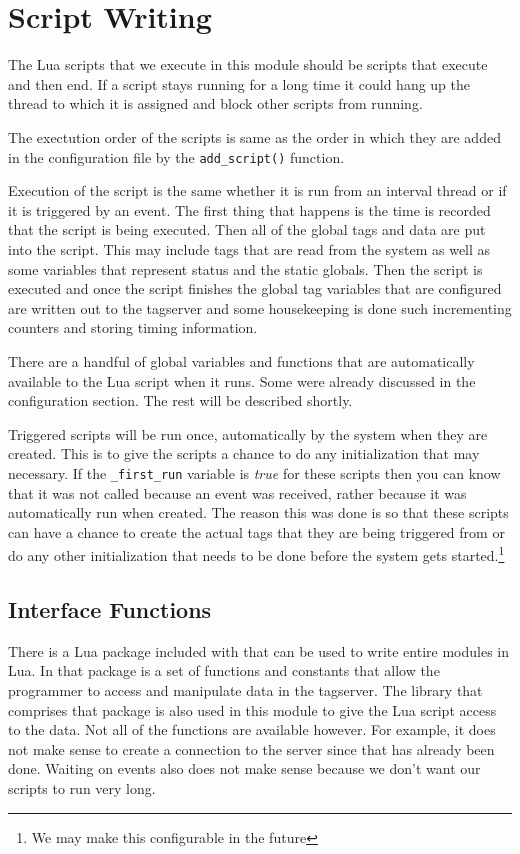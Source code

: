 \section{Script Writing}

The Lua scripts that we execute in this module should be scripts that execute and then
end.  If a script stays running for a long time it could hang up the thread to which it
is assigned and block other scripts from running.

The exectution order of the scripts is same as the order in which they are added in the
configuration file by the \texttt{add\_script()} function.

Execution of the script is the same whether it is run from an interval thread or if
it is triggered by an event.  The first thing that happens is the time is
recorded
that the script is being executed.  Then all of the global
tags and data are put into the script.  This may include tags that are read from the
system as well as some variables that represent status and the static globals.
Then the script is executed and once the script finishes the global tag variables
that are configured are written out to the tagserver and some housekeeping is done such
incrementing counters and storing timing information.

There are a handful of global variables and functions that are automatically available
to the Lua script when it runs.  Some were already discussed in the configuration
section.  The rest will be described shortly.

Triggered scripts will be run once, automatically by the system when they
are created.  This is to give the scripts a chance to do any initialization
that may necessary.  If the \texttt{\_first\_run} variable is \textit{true} for
these scripts then you can know that it was not called because an event
was received, rather because it was automatically run when created.  The
reason this was done is so that these scripts can have a chance to create
the actual tags that they are being triggered from or do any other
initialization that needs to be done before the system gets
started.\footnote{We may make this configurable in the future}

\subsection{\opendax{} Interface Functions}

There is a Lua package included with \opendax{} that can be used to write entire \opendax{}
modules in Lua.
In that package is a set of functions and constants that allow the programmer to access
and manipulate data in the tagserver.  The library that comprises that package is also
used in this module to give the Lua script access to the \opendax{} data.  Not all of
the functions are available however.  For example, it does not make sense to create
a connection to the server since that has already been done.  Waiting on events also
does not make sense because we don't want our scripts to run very long.

